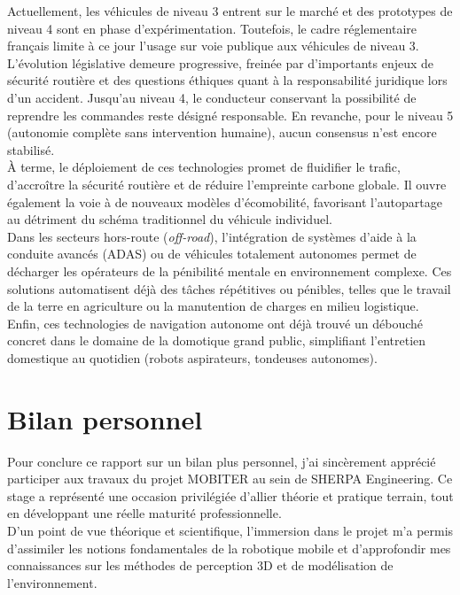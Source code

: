 Actuellement, les véhicules de niveau 3 entrent sur le marché et des prototypes de niveau 4 sont en phase d'expérimentation. Toutefois, le cadre réglementaire français limite à ce jour l'usage sur voie publique aux véhicules de niveau 3. L'évolution législative demeure progressive, freinée par d'importants enjeux de sécurité routière et des questions éthiques quant à la responsabilité juridique lors d'un accident. Jusqu'au niveau 4, le conducteur conservant la possibilité de reprendre les commandes reste désigné responsable. En revanche, pour le niveau 5 (autonomie complète sans intervention humaine), aucun consensus n'est encore stabilisé.\\

À terme, le déploiement de ces technologies promet de fluidifier le trafic, d'accroître la sécurité routière et de réduire l'empreinte carbone globale. Il ouvre également la voie à de nouveaux modèles d'écomobilité, favorisant l'autopartage au détriment du schéma traditionnel du véhicule individuel.\\

Dans les secteurs hors-route (\emph{off-road}), l'intégration de systèmes d'aide à la conduite avancés (ADAS) ou de véhicules totalement autonomes permet de décharger les opérateurs de la pénibilité mentale en environnement complexe. Ces solutions automatisent déjà des tâches répétitives ou pénibles, telles que le travail de la terre en agriculture ou la manutention de charges en milieu logistique.\\

Enfin, ces technologies de navigation autonome ont déjà trouvé un débouché concret dans le domaine de la domotique grand public, simplifiant l'entretien domestique au quotidien (robots aspirateurs, tondeuses autonomes).



\newpage
\section*{Bilan personnel}

Pour conclure ce rapport sur un bilan plus personnel, j'ai sincèrement apprécié participer aux travaux du projet MOBITER au sein de SHERPA Engineering. Ce stage a représenté une occasion privilégiée d'allier théorie et pratique terrain, tout en développant une réelle maturité professionnelle.\\

D'un point de vue théorique et scientifique, l'immersion dans le projet m'a permis d'assimiler les notions fondamentales de la robotique mobile et d'approfondir mes connaissances sur les méthodes de perception 3D et de modélisation de l'environnement.\\

